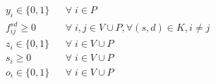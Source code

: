 			
			
			
			
			
			\begin{equation*} \label{eq:Vvars}
			\begin{array}{rlclcl}	
			& y_i \in \{0, 1\} && \forall \; i \in P \\
			& f^{sd}_{ij} \ge 0 && \forall \; i , j \in V \cup P, \forall (s,d) \in K, i \neq j \\
			& z_i \in \{0, 1\} && \forall \; i \in V \cup P \\
			& s_i \ge 0 && \forall \; i \in V \cup P \\
			& o_i \in \{0, 1\} && \forall \; i \in V \cup P \\
			\end{array}
			\end{equation*}
 

